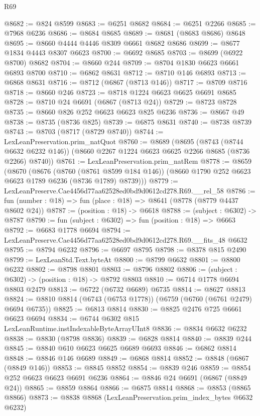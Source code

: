 \begin{lexlean}{R69}
\begin{coremodule}
{@8682 := @824 @8599
@8683 := @6251 @8682
@8684 := @6251 @2266
@8685 := @7968 @6236
@8686 := @8684 @8685
@8689 := @8681 (@8683 @8686) @8648
@8695 := @8660 @4444 @4446 @8309 @6661 @8682 @8686
@8699 := @8677 @1834 @4443 @8307 @6623
@8700 := @6692 @8685
@8703 := @8699 (@6922 @8700) @8682
@8704 := @8660 @244
@8709 := @8704 @1830 @6623 @6661 @6893 @8700
@8710 := @6862 @8631
@8712 := @8710 @146 @6893
@8713 := @6868 @8631
@8716 := @8712 (@6867 (@8713 @146))
@8717 := @8709 @8716
@8718 := @8660 @246
@8723 := @8718 @1224 @6623 @6625 @6691 @8685
@8728 := @8710 @24 @6691 (@6867 (@8713 @24))
@8729 := @8723 @8728
@8735 := @8660 @826 @252 @6623 @6623 @825 @6236
@8736 := @8667 @49
@8738 := @8735 (@8736 @825)
@8739 := @6875 @8631
@8740 := @8738 @8739
@8743 := @8703 (@8717 (@8729 @8740))
@8744 := LexLeanPreservation.prim_natQuot
@8760 := @8689
    (@8695
      (@8743 (@8744 @6632 @6232 @146))
      (@8660 @2267 @1224 @6623 @6625 @2266 @8685 (@8736 @2266) @8740))
@8761 := LexLeanPreservation.prim_natRem
@8778 := @8659
    (@8670
      (@8676
        (@8760 (@8761 @8599 @184 @146))
        (@8660 @1790 @252 @6623 @6623 @1789 @6236 (@8736 @1789) @8739)))
@8779 := LexLeanPreserve.Cae4456d77aa62528ed0bd9d0612cd278.R69.__rel_58
@8786 := fun (number : @18) => fun (place : @18) => @8641 (@8778 (@8779 @4437 @8602 @24))
@8787 := (position : @18) -> @6618
@8788 := (subject : @6302) -> @8787
@8790 := fun (subject : @6302) => fun (position : @18) => @6663
@8792 := @6683 @1778 @6694
@8794 := LexLeanPreserve.Cae4456d77aa62528ed0bd9d0612cd278.R69.__fits_48 @6632
@8795 := @8794 @6232
@8796 := @6697 @8795
@8798 := @8378 @815 @2490
@8799 := LexLeanStd.Text.byteAt
@8800 := @8799 @6632
@8801 := @8800 @6232
@8802 := @8798 @8801
@8803 := @8796 @8802
@8806 := (subject : @6302) -> (position : @18) -> @8792 @8803
@8810 := @6714 @1778 @6694 @8803 @2479
@8813 := @6722 (@6732 @6689) @6735
@8814 := @8627 @8813
@8824 := @8810 @8814 (@6743 (@6753 @1778)) (@6759 (@6760 (@6761 @2479) @6694 @6735))
@8825 := @6813 @8814
@8830 := @8825 @2476 @725 @6661 @6623 @6694
@8834 := @6744 @6302 @815 LexLeanRuntime.instIndexableByteArrayUInt8
@8836 := @8834 @6632 @6232
@8838 := @8830 (@8798 @8836)
@8839 := @6828 @8814
@8840 := @8839 @244
@8845 := @8840 @610 @6623 @6625 @6689 @6693
@8846 := @6862 @8814
@8848 := @8846 @146 @6689
@8849 := @6868 @8814
@8852 := @8848 (@6867 (@8849 @146))
@8853 := @8845 @8852
@8854 := @8839 @246
@8859 := @8854 @252 @6623 @6623 @6691 @6236
@8864 := @8846 @24 @6691 (@6867 (@8849 @24))
@8865 := @8859 @8864
@8866 := @6875 @8814
@8868 := @8853 (@8865 @8866)
@8873 := @8838 @8868 (LexLeanPreservation.prim_index_bytes @6632 @6232)
}
\end{coremodule}
\end{lexlean}
